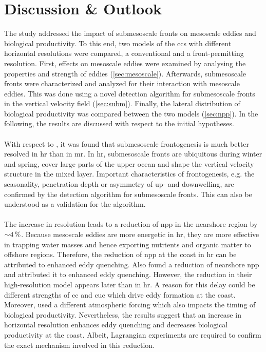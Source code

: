 \chapter{Discussion \& Outlook}\label{sec:discussion}

The study addressed the impact of submesoscale fronts on mesoscale eddies and biological productivity. To this end, two models of the \ac{ccs} with different horizontal resolutions were compared, a conventional and a front-permitting resolution. First, effects on mesoscale eddies were examined by analysing the properties and strength of eddies (\autoref{sec:mesoscale}). Afterwards, submesoscale fronts were characterized and analyzed for their interaction with mesoscale eddies. This was done using a novel detection algorithm for submesoscale fronts in the vertical velocity field (\autoref{sec:subm}). Finally, the lateral distribution of biological productivity was compared between the two models (\autoref{sec:npp}). In the following, the results are discussed with respect to the initial hypotheses.\\
\\
With respect to , it was found that submesoscale frontogenesis is much better resolved in \ac{hr} than in \ac{mr}. In \ac{hr}, submesoscale fronts are ubiquitous during winter and spring, cover large parts of the upper ocean and shape the vertical velocity structure in the mixed layer. Important characteristics of frontogenesis, e.g. the seasonality, penetration depth or asymmetry of up- and downwelling, are confirmed by the detection algorithm for submesoscale fronts. This can also be understood as a validation for the algorithm.\\
\\
The increase in resolution leads to a reduction of \ac{npp} in the nearshore region by ${\sim} \SI{4}{\percent}$. Because mesoscale eddies are more energetic in \ac{hr}, they are more effective in trapping water masses and hence exporting nutrients and organic matter to offshore regions. Therefore, the reduction of \ac{npp} at the coast in \ac{hr} can be attributed to enhanced eddy quenching. Also \textcite{kessouri-2020-seasonal-prod} found a reduction of nearshore \ac{npp} and attributed it to enhanced eddy quenching. However, the reduction in their high-resolution model appears later than in \ac{hr}. A reason for this delay could be different strengths of \ac{cc} and \ac{cuc} which drive eddy formation at the coast. Moreover, \textcite{kessouri-2020-seasonal-prod} used a different atmospheric forcing which also impacts the timing of biological productivity. Nevertheless, the results suggest that an increase in horizontal resolution enhances eddy quenching and decreases biological productivity at the coast. Albeit, Lagrangian experiments are required to confirm the exact mechanism involved in this reduction.\\
